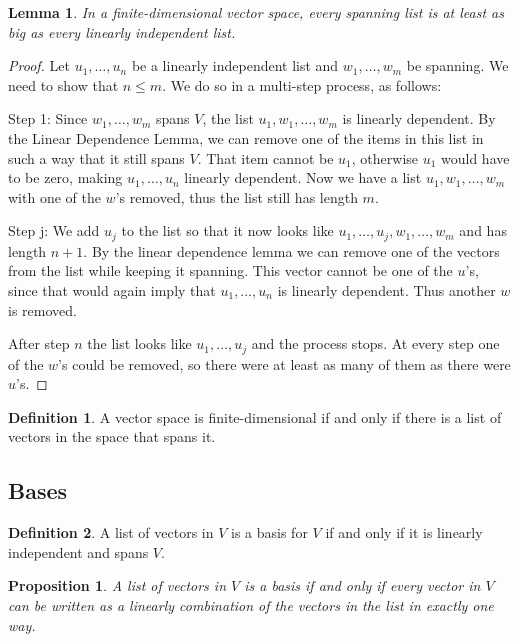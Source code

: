\documentclass{article}
\newtheorem{lemma}{Lemma}[subsection]
\newtheorem{proposition}{Proposition}[subsection]
\theoremstyle{definition}
\newtheorem{definition}{Definition}[subsection]
\theoremstyle{remark}
\begin{document}
\begin{lemma}
    In a finite-dimensional vector space, every spanning list is at least as big as every linearly independent list.
\end{lemma}

\begin{proof}
    Let $u_1, \dots, u_n$ be a linearly independent list and $w_1, \dots, w_m$ be spanning. We need to show that $n \leq m$. We do so in a multi-step process, as follows:
    
    Step 1: Since $w_1, \dots, w_m$ spans $V$, the list $u_1, w_1, \dots, w_m$ is linearly dependent. By the Linear Dependence Lemma, we can remove one of the items in this list in such a way that it still spans $V$. That item cannot be $u_1$, otherwise $u_1$ would have to be zero, making $u_1, \dots, u_n$ linearly dependent. Now we have a list $u_1, w_1, \dots, w_m$ with one of the $w$'s removed, thus the list still has length $m$.
    
    Step j: We add $u_j$ to the list so that it now looks like $u_1, \dots, u_j, w_1, \dots, w_m$ and has length $n+1$. By the linear dependence lemma we can remove one of the vectors from the list while keeping it spanning. This vector cannot be one of the $u$'s, since that would again imply that $u_1, \dots, u_n$ is linearly dependent. Thus another $w$ is removed.
    
    After step $n$ the list looks like $u_1, \dots, u_j$ and the process stops. At every step one of the $w$'s could be removed, so there were at least as many of them as there were $u$'s.
\end{proof}

\begin{definition}
    A vector space is finite-dimensional if and only if there is a list of vectors in the space that spans it.
\end{definition}

\subsection{Bases}

\begin{definition}
    A list of vectors in $V$ is a basis for $V$ if and only if it is linearly independent and spans $V$.
\end{definition}

\begin{proposition}
   A list of vectors in $V$ is a basis if and only if every vector in $V$ can be written as a linearly combination of the vectors in the list in exactly one way.
\end{proposition}
\end{document}
